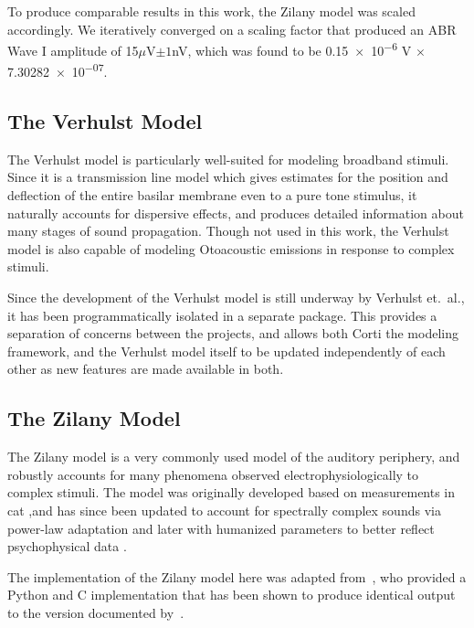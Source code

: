 To produce comparable results in this work, the Zilany model was scaled accordingly. We iteratively converged on a scaling factor that produced an ABR Wave I amplitude of 15$\mu$V$\pm 1$nV, which was found to be \num{0.15e-6} V $\times$ \num{7.30282e-07}.


\subsection{The Verhulst Model} %
\label{sub:the_verhulst_model1}
The Verhulst model is particularly well-suited for modeling broadband stimuli.  Since it is a transmission line model which gives estimates for the position and deflection of the entire basilar membrane even to a pure tone stimulus, it naturally accounts for dispersive effects, and produces detailed information about many stages of sound propagation. Though not used in this work, the Verhulst model is also capable of modeling Otoacoustic emissions in response to complex stimuli. 

Since the development of the Verhulst model is still underway by Verhulst et.~al., it has been programmatically isolated in a separate package.  This provides a separation of concerns between the projects, and allows both Corti the modeling framework, and the Verhulst model itself to be updated independently of each other as new features are made available in both.
\subsection{The Zilany Model} %
\label{sub:the_zilany_model}
The Zilany model is a very commonly used model of the auditory periphery, and robustly accounts for many phenomena observed electrophysiologically to complex stimuli.  The model was originally developed based on measurements in cat \citep{Zilany2006Modeling},and has since been updated to account for spectrally complex sounds via power-law adaptation \citep{Zilany2007Predictions} and later with humanized parameters to better reflect psychophysical data \citep{Zilany2014Updated}. 

The implementation of the Zilany model here was adapted from~\cite{Rudnicki2014Cochlea}, who provided a Python and C implementation that has been shown to produce identical output to the version documented by~\cite{Zilany2014Updated}.




